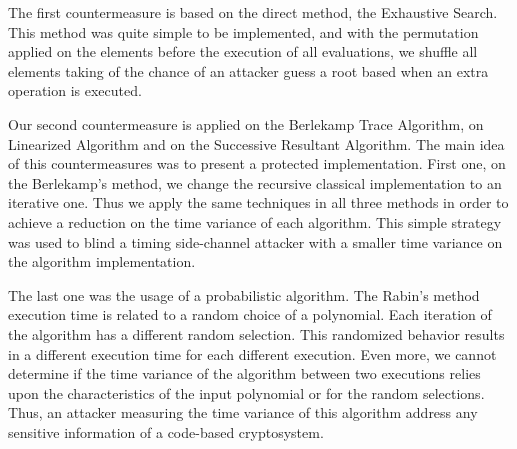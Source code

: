The first countermeasure is based on the direct method, the Exhaustive Search. This method was quite simple to be implemented, and with the permutation applied on the elements before the execution of all evaluations, we shuffle all elements taking of the chance of an attacker guess a root based when an extra operation is executed.

Our second countermeasure is applied on the Berlekamp Trace Algorithm, on Linearized Algorithm and on the Successive Resultant Algorithm. The main idea of this countermeasures was to present a protected implementation. First one, on the Berlekamp's method, we change the recursive classical implementation to an iterative one. Thus we apply the same techniques in all three methods in order to achieve a reduction on the time variance of each algorithm. This simple strategy was used to blind a timing side-channel attacker with a smaller time variance on the algorithm implementation. 

The last one was the usage of a probabilistic algorithm. The Rabin's method execution time is related to a random choice of a polynomial. Each iteration of the algorithm has a different random selection. This randomized behavior results in a different execution time for each different execution. Even more, we cannot determine if the time variance of the algorithm between two executions relies upon the characteristics of the input polynomial or for the random selections. Thus, an attacker measuring the time variance of this algorithm address any sensitive information of a code-based cryptosystem.



